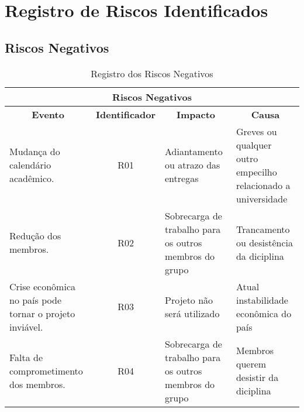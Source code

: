 \section{Registro de Riscos Identificados}
\subsection{Riscos Negativos}
\pagebreak
\begin{table}[!h]
  \centering
  \caption{Registro dos Riscos Negativos}
  \begin{tabular}{|l|c|l|l|}
    \hline
    \multicolumn{4}{|c|}{\textbf{Riscos Negativos}}                                                                                                                                                                                                               \\ \hline
    \multicolumn{1}{|c|}{\textbf{Evento}}                          & \textbf{Identificador} & \multicolumn{1}{c|}{\textbf{Impacto}}                                    & \multicolumn{1}{c|}{\textbf{Causa}}                                                      \\ \hline
    \parbox[t]{5cm}{Mudança do calendário acadêmico.}                               & R01                    & \parbox[t]{4cm}{Adiantamento ou atrazo das entregas}                                      & \parbox[t]{4cm}{Greves ou qualquer outro empecilho relacionado a universidade}                            \\ \hline
    Redução dos membros.                                           & R02                    & \parbox[t]{4cm}{Sobrecarga de trabalho para os outros membros do grupo}                   & \parbox[t]{4cm}{Trancamento ou desistência da diciplina}                                                  \\ \hline
    \parbox[t]{5cm}{Crise econômica no país pode tornar o projeto inviável.}        & R03                    & \parbox[t]{4cm}{Projeto não será utilizado}                                               & \parbox[t]{4cm}{Atual instabilidade econômica do país}                                                    \\ \hline
    \parbox[t]{5cm}{Falta de comprometimento dos membros.}                          & R04                    & \parbox[t]{4cm}{Sobrecarga de trabalho para os outros membros do grupo}                   & \parbox[t]{4cm}{Membros querem desistir da diciplina}                                                     \\ \hline

\end{tabular}
\end{table}
